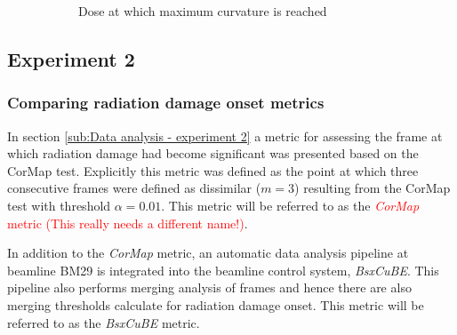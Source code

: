 \begin{figure}
\begin{subfigure}[b]{0.8\textwidth}
            \caption{Dose at which maximum curvature is reached}
            \label{fig:Scavenger plot - maximum curvature}
    \end{subfigure}
    \caption{}
    \label{fig:Combined Scavenger results - Rebecca data}
\end{figure}

\subsection{Experiment 2}
\label{sub:Experiment 2 - Results}

\subsubsection{Comparing radiation damage onset metrics}
\label{subs:Comparing radiation damage onset metrics}
In section \ref{sub:Data analysis - experiment 2} a metric for assessing the frame at which radiation damage had become significant was presented based on the CorMap test.
Explicitly this metric was defined as the point at which three consecutive frames were defined as dissimilar ($m = 3$) resulting from the CorMap test with threshold $\alpha = 0.01$.
This metric will be referred to as the \textcolor{red}{\textit{CorMap} metric (This really needs a different name!)}.

In addition to the \textit{CorMap} metric, an automatic data analysis pipeline at beamline BM29 \cite{brennich2016online} is integrated into the beamline control system, \textit{BsxCuBE}.
This pipeline also performs merging analysis of frames and hence there are also merging thresholds calculate for radiation damage onset.
This metric will be referred to as the \textit{BsxCuBE} metric.

